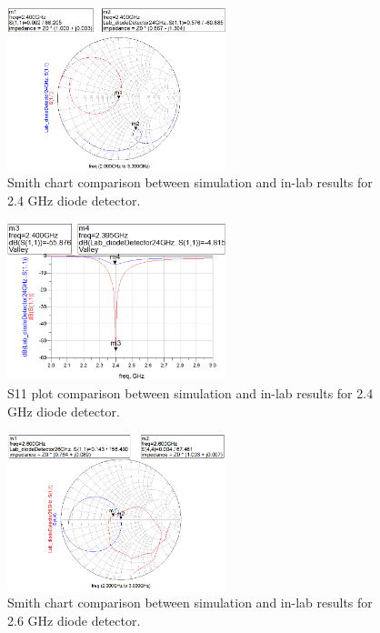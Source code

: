 \documentclass[conference]{IEEEtran}
\begin{document}
\begin{figure}[!htb]
\centering
\includegraphics[width=2.5in]{diode-pics/diodedetectorLab24Smith.png}
\caption{Smith chart comparison between simulation and in-lab results for 2.4 GHz diode detector.}
\label{fig:resultSmith24}
\end{figure}

\begin{figure}[!htb]
\centering
\includegraphics[width=2.5in]{diode-pics/diodedetectorLab24S11.png}
\caption{S11 plot comparison between simulation and in-lab results for 2.4 GHz diode detector.}
\label{fig:resultS1124}
\end{figure}

\begin{figure}[!htb]
\centering
\includegraphics[width=2.5in]{diode-pics/diodedetectorLab26Smith.png}
\caption{Smith chart comparison between simulation and in-lab results for 2.6 GHz diode detector.}
\label{fig:resultSmith26}
\end{figure}
\end{document}
